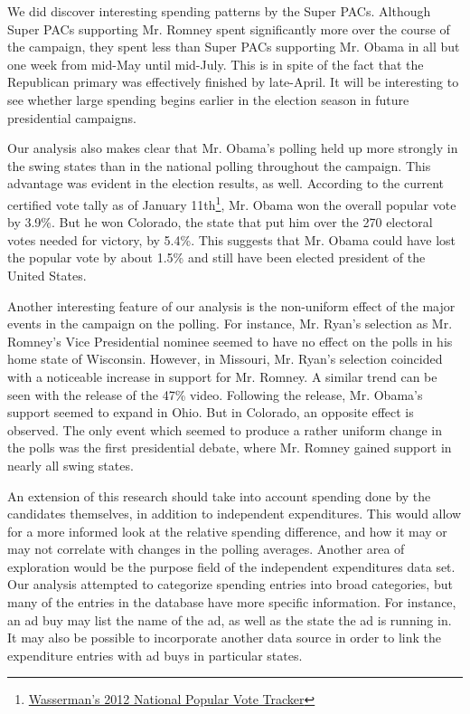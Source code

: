 \documentclass[11pt]{article}\usepackage{graphicx, color}
\begin{document}
We did discover interesting spending patterns by the Super PACs. Although Super PACs supporting Mr. Romney spent significantly more over the course of the campaign, they spent less than Super PACs supporting Mr. Obama in all but one week from mid-May until mid-July. This is in spite of the fact that the Republican primary was effectively finished by late-April. It will be interesting to see whether large spending begins earlier in the election season in future presidential campaigns.

Our analysis also makes clear that Mr. Obama's polling held up more strongly in the swing states than in the national polling throughout the campaign. This advantage was evident in the election results, as well. According to the current certified vote tally as of January 11th\footnote{\href{https://docs.google.com/spreadsheet/lv?key=0AjYj9mXElO_QdHpla01oWE1jOFZRbnhJZkZpVFNKeVE&toomany=true}{Wasserman's 2012 National Popular Vote Tracker}}, Mr. Obama won the overall popular vote by 3.9\%. But he won Colorado, the state that put him over the 270 electoral votes needed for victory, by 5.4\%. This suggests that Mr. Obama could have lost the popular vote by about 1.5\% and still have been elected president of the United States.

Another interesting feature of our analysis is the non-uniform effect of the major events in the campaign on the polling. For instance, Mr. Ryan's selection as Mr. Romney's Vice Presidential nominee seemed to have no effect on the polls in his home state of Wisconsin. However, in Missouri, Mr. Ryan's selection coincided with a noticeable increase in support for Mr. Romney. A similar trend can be seen with the release of the 47\% video. Following the release, Mr. Obama's support seemed to expand in Ohio. But in Colorado, an opposite effect is observed. The only event which seemed to produce a rather uniform change in the polls was the first presidential debate, where Mr. Romney gained support in nearly all swing states.

An extension of this research should take into account spending done by the candidates themselves, in addition to independent expenditures. This would allow for a more informed look at the relative spending difference, and how it may or may not correlate with changes in the polling averages. Another area of exploration would be the purpose field of the independent expenditures data set. Our analysis attempted to categorize spending entries into broad categories, but many of the entries in the database have more specific information. For instance, an ad buy may list the name of the ad, as well as the state the ad is running in. It may also be possible to incorporate another data source in order to link the expenditure entries with ad buys in particular states.
\end{document}
